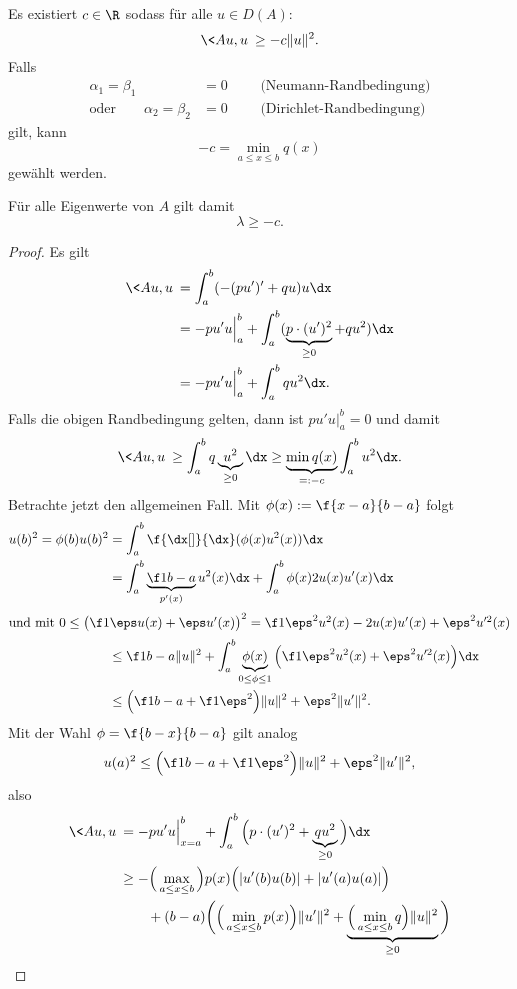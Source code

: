 \begin{lem} \label{3.15}
	Es existiert $c \in \R$ sodass für alle $u \in D(A)$:
	\[
		\<Au,u\> \ge -c \|u\|^2.
	\]
	Falls
	\begin{align*}
		\alpha_1 = \beta_1 &= 0 \qquad \text{ (Neumann-Randbedingung)}  \\
		\text{oder} \qquad
		\alpha_2 = \beta_2 &= 0 \qquad \text{ (Dirichlet-Randbedingung)}
	\end{align*}
	gilt, kann
	\[
		-c = \min_{a \le x \le b} q(x)
	\]
	gewählt werden.

	Für alle Eigenwerte von $A$ gilt damit
	\[
		\lambda \ge -c.
	\]
	\begin{proof}
		Es gilt
		\begin{align*}
			\<Au,u\>
			&= \int_a^b (-(pu')' + qu) u \dx \\
			&= -pu'u \Big|_a^b + \int_a^b (\underbrace{p\cdot(u')^2}_{\ge 0} + qu^2) \dx \\
			&= -pu'u \Big|_a^b + \int_a^b q u^2 \dx.
		\end{align*}
		Falls die obigen Randbedingung gelten, dann ist $pu'u \big|_a^b = 0$ und damit
		\[
			\<Au,u\>
			\ge  \int_a^b q \underbrace{u^2}_{\ge 0} \dx
			\ge \underbrace{\min q(x)}_{=: -c} \int_a^b u^2 \dx.
		\]
		Betrachte jetzt den allgemeinen Fall.
		Mit $\phi(x) := \f {x-a}{b-a}$ folgt
		\begin{align*}
			u(b)^2
			= \phi(b) u(b)^2
			&= \int_a^b \f {\dx[]}{\dx} (\phi(x) u^2(x)) \dx \\
			&= \int_a^b \underbrace{\f 1{b-a}}_{p'(x)} u^2(x) \dx + \int_a^b \phi(x) 2u(x) u'(x) \dx \\
		\intertext{und mit $0 \le \big( \f 1\eps u(x) + \eps u'(x) \big)^2 = \f 1{\eps^2} u^2(x) - 2u(x)u'(x) + \eps^2 u'^2(x)$}
			&\le \f 1{b-a}\|u\|^2 + \int_a^b \underbrace{\phi(x)}_{0 \le \phi \le 1} \Big( \f 1{\eps^2} u^2(x) + \eps^2 u'^2(x) \Big) \dx \\
			&\le \Big( \f 1{b-a} + \f 1{\eps^2}\Big)\|u\|^2 + \eps^2 \|u'\|^2.
		\end{align*}
		Mit der Wahl $\phi = \f {b-x}{b-a}$ gilt analog
		\[
			u(a)^2 \le \Big( \f 1{b-a} + \f 1{\eps^2}\Big)\|u\|^2 + \eps^2 \|u'\|^2,
		\]
		also
		\begin{align*}
			\<Au,u\>
			&= -pu'u \Big|_{x=a}^b + \int_a^b \Big(p\cdot (u')^2 + \underbrace{qu^2}_{\ge 0}\Big) \dx \\
			&\ge - \Big( \max_{a \le x \le b} \Big) p(x) \Big( |u'(b)u(b)| + |u'(a)u(a)|\Big) \\
				&\qquad+ (b-a)\bigg(\Big( \min_{a \le x \le b} p(x) \Big) \|u'\|^2 + \underbrace{\Big(\min_{a \le x \le b} q \Big) \|u\|^2}_{\ge 0}\bigg)

\end{align*}
\end{proof}
\end{lem}
